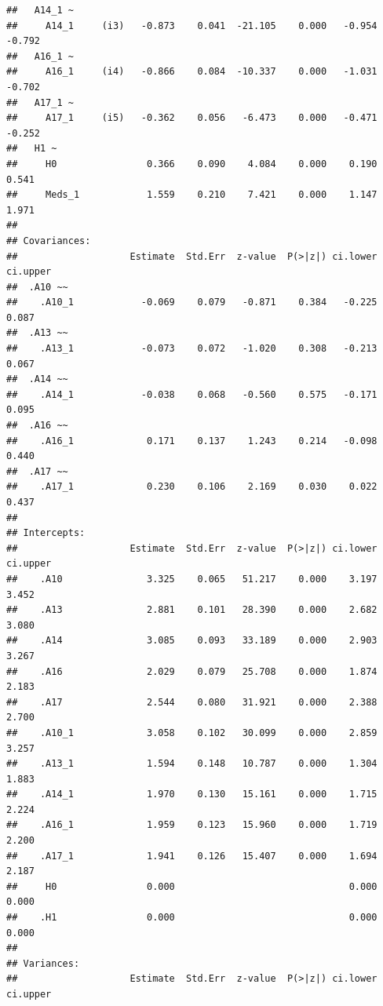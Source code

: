 \documentclass[]{article}
\begin{document}
\begin{verbatim}
##   A14_1 ~                                                               
##     A14_1     (i3)   -0.873    0.041  -21.105    0.000   -0.954   -0.792
##   A16_1 ~                                                               
##     A16_1     (i4)   -0.866    0.084  -10.337    0.000   -1.031   -0.702
##   A17_1 ~                                                               
##     A17_1     (i5)   -0.362    0.056   -6.473    0.000   -0.471   -0.252
##   H1 ~                                                                  
##     H0                0.366    0.090    4.084    0.000    0.190    0.541
##     Meds_1            1.559    0.210    7.421    0.000    1.147    1.971
## 
## Covariances:
##                    Estimate  Std.Err  z-value  P(>|z|) ci.lower ci.upper
##  .A10 ~~                                                                
##    .A10_1            -0.069    0.079   -0.871    0.384   -0.225    0.087
##  .A13 ~~                                                                
##    .A13_1            -0.073    0.072   -1.020    0.308   -0.213    0.067
##  .A14 ~~                                                                
##    .A14_1            -0.038    0.068   -0.560    0.575   -0.171    0.095
##  .A16 ~~                                                                
##    .A16_1             0.171    0.137    1.243    0.214   -0.098    0.440
##  .A17 ~~                                                                
##    .A17_1             0.230    0.106    2.169    0.030    0.022    0.437
## 
## Intercepts:
##                    Estimate  Std.Err  z-value  P(>|z|) ci.lower ci.upper
##    .A10               3.325    0.065   51.217    0.000    3.197    3.452
##    .A13               2.881    0.101   28.390    0.000    2.682    3.080
##    .A14               3.085    0.093   33.189    0.000    2.903    3.267
##    .A16               2.029    0.079   25.708    0.000    1.874    2.183
##    .A17               2.544    0.080   31.921    0.000    2.388    2.700
##    .A10_1             3.058    0.102   30.099    0.000    2.859    3.257
##    .A13_1             1.594    0.148   10.787    0.000    1.304    1.883
##    .A14_1             1.970    0.130   15.161    0.000    1.715    2.224
##    .A16_1             1.959    0.123   15.960    0.000    1.719    2.200
##    .A17_1             1.941    0.126   15.407    0.000    1.694    2.187
##     H0                0.000                               0.000    0.000
##    .H1                0.000                               0.000    0.000
## 
## Variances:
##                    Estimate  Std.Err  z-value  P(>|z|) ci.lower ci.upper

\end{verbatim}
\end{document}
